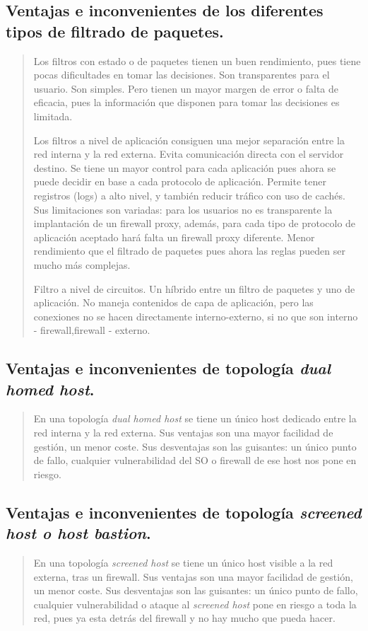 \documentclass[11pt]{article}
\begin{document}
\subsection{Ventajas e inconvenientes de los diferentes tipos de filtrado de paquetes.}
\label{sec:orgc9d69f2}
\begin{quote}
Los filtros con estado o de paquetes tienen un buen rendimiento, pues tiene pocas dificultades en tomar las decisiones. Son transparentes para el usuario. Son simples. Pero tienen un mayor margen de error o falta de eficacia, pues la información que disponen para tomar las decisiones es limitada.

Los filtros a nivel de aplicación consiguen una mejor separación entre la red interna y la red externa. Evita comunicación directa con el servidor destino. Se tiene un mayor control para cada aplicación pues ahora se puede decidir en base a cada protocolo de aplicación. Permite tener registros (logs) a alto nivel, y también reducir tráfico con uso de cachés. Sus limitaciones son variadas: para los usuarios no es transparente la implantación de un firewall proxy, además, para cada tipo de protocolo de aplicación aceptado hará falta un firewall proxy diferente. Menor rendimiento que el filtrado de paquetes pues ahora las reglas pueden ser mucho más complejas.

Filtro a nivel de circuitos. Un híbrido entre un filtro de paquetes y uno de aplicación. No maneja contenidos de capa de aplicación, pero las conexiones no se hacen directamente interno-externo, si no que son interno - firewall,firewall - externo.
\end{quote}
\subsection{Ventajas e inconvenientes de topología \emph{dual homed host}.}
\label{sec:org14af22c}
\begin{quote}
En una topología \emph{dual homed host} se tiene un único host dedicado entre la red interna y la red externa. Sus ventajas son una mayor facilidad de gestión, un menor coste. Sus desventajas son las guisantes: un único punto de fallo, cualquier vulnerabilidad del SO o firewall de ese host nos pone en riesgo.
\end{quote}
\subsection{Ventajas e inconvenientes de topología \emph{screened host o host bastion}.}
\label{sec:orga55ef17}
\begin{quote}
En una topología \emph{screened host} se tiene un único host visible a la red externa, tras un firewall. Sus ventajas son una mayor facilidad de gestión, un menor coste. Sus desventajas son las guisantes: un único punto de fallo, cualquier vulnerabilidad o ataque al \emph{screened host} pone en riesgo a toda la red, pues ya esta detrás del firewall y no hay mucho que pueda hacer.
\end{quote}
\end{document}
